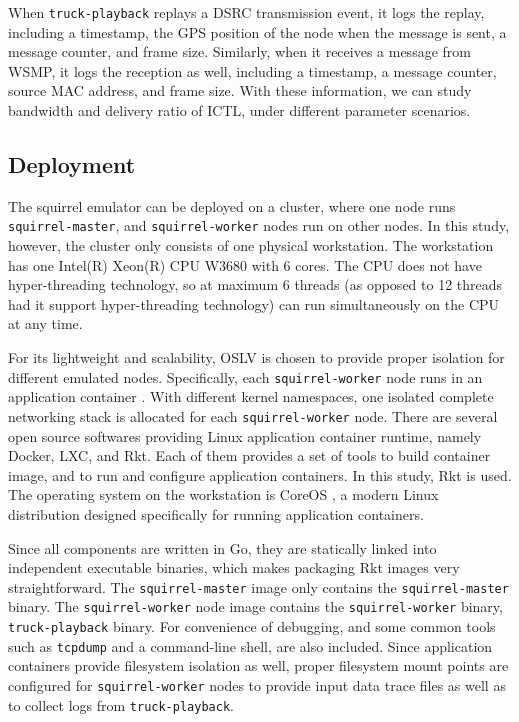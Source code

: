 \documentclass[12pt]{report}
\begin{document}
When \texttt{truck-playback} replays a DSRC transmission event, it logs the replay, including a timestamp, the GPS position of the node when the message is sent, a message counter, and frame size. Similarly, when it receives a message from WSMP, it logs the reception as well, including a timestamp, a message counter, source MAC address, and frame size. With these information, we can study bandwidth and delivery ratio of ICTL, under different parameter scenarios.

\subsection{Deployment}

The squirrel emulator can be deployed on a cluster, where one node runs \texttt{squirrel-master}, and \texttt{squirrel-worker} nodes run on other nodes. In this study, however, the cluster only consists of one physical workstation. The workstation has one Intel(R) Xeon(R) CPU W3680 with 6 cores. The CPU does not have hyper-threading technology, so at maximum 6 threads (as opposed to 12 threads had it support hyper-threading technology) can run simultaneously on the CPU at any time.

For its lightweight and scalability, OSLV is chosen to provide proper isolation for different emulated nodes. Specifically, each \texttt{squirrel-worker} node runs in an application container \cite{menage2007adding}. With different kernel namespaces, one isolated complete networking stack is allocated for each \texttt{squirrel-worker} node. There are several open source softwares providing Linux application container runtime, namely Docker, LXC, and Rkt. Each of them provides a set of tools to build container image, and to run and configure application containers. In this study, Rkt \cite{rkt} is used. The operating system on the workstation is CoreOS \cite{coreos}, a modern Linux distribution designed specifically for running application containers.

Since all components are written in Go, they are statically linked into independent executable binaries, which makes packaging Rkt images very straightforward. The \texttt{squirrel-master} image only contains the \texttt{squirrel-master} binary. The \texttt{squirrel-worker} node image contains the \texttt{squirrel-worker} binary, \texttt{truck-playback} binary. For convenience of debugging, and some common tools such as \texttt{tcpdump} and a command-line shell, are also included. Since application containers provide filesystem isolation as well, proper filesystem mount points are configured for \texttt{squirrel-worker} nodes to provide input data trace files as well as to collect logs from \texttt{truck-playback}.
\end{document}
